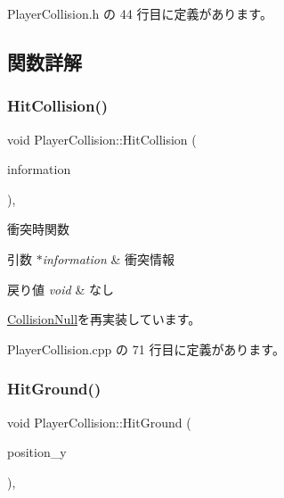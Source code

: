 Player\+Collision.\+h の 44 行目に定義があります。



\subsection{関数詳解}
\mbox{\label{class_player_collision_aed2775b2a14b6868160d6668ed928f8d}} 
\subsubsection{\texorpdfstring{Hit\+Collision()}{HitCollision()}}
{\footnotesize\ttfamily void Player\+Collision\+::\+Hit\+Collision (\begin{DoxyParamCaption}\item[{\mbox{\hyperlink{class_collision_information}{Collision\+Information}} $\ast$}]{information }\end{DoxyParamCaption})\hspace{0.3cm}{\ttfamily [override]}, {\ttfamily [virtual]}}



衝突時関数 


\begin{DoxyParams}{引数}
{\em $\ast$information} & 衝突情報 \\
\hline
\end{DoxyParams}

\begin{DoxyRetVals}{戻り値}
{\em void} & なし \\
\hline
\end{DoxyRetVals}


\mbox{\hyperlink{class_collision_null_ad3473329f7af1b86ea6dfc1c4e8e81c1}{Collision\+Null}}を再実装しています。



 Player\+Collision.\+cpp の 71 行目に定義があります。

\mbox{\label{class_player_collision_a3522ce17b1e1752f2737c2243582ecb0}} 
\subsubsection{\texorpdfstring{Hit\+Ground()}{HitGround()}}
{\footnotesize\ttfamily void Player\+Collision\+::\+Hit\+Ground (\begin{DoxyParamCaption}\item[{float}]{position\+\_\+y }\end{DoxyParamCaption})\hspace{0.3cm}{\ttfamily [override]}, {\ttfamily [virtual]}}



